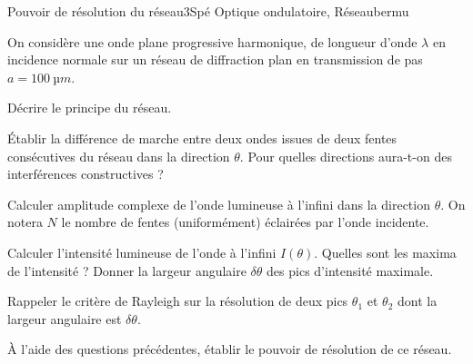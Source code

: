 \begin{exercise}{Pouvoir de résolution du réseau}{3}{Spé}
{Optique ondulatoire, Réseau}{bermu}

On considère une onde plane progressive harmonique, de longueur d'onde $\lambda$ en incidence normale sur un réseau de diffraction plan en transmission de pas $a = \SI{100}{µm}$.

\begin{questions}
\questioncours Décrire le principe du réseau.

\question Établir la différence de marche entre deux ondes issues de deux fentes consécutives du réseau dans la direction $\theta$. Pour quelles directions aura-t-on des interférences constructives ?

\question Calculer amplitude complexe de l'onde lumineuse à l'infini dans la direction $\theta$. On notera $N$ le nombre de fentes (uniformément) éclairées par l'onde incidente.

\question Calculer l'intensité lumineuse de l'onde à l'infini $I(\theta)$. Quelles sont les maxima de l'intensité ? Donner la largeur angulaire $\delta\theta$ des pics d'intensité maximale.


\question Rappeler le critère de Rayleigh sur la résolution de deux pics $\theta_1$ et $\theta_2$ dont la largeur angulaire est $\delta\theta$.

\question \`A l'aide des questions précédentes, établir le pouvoir de résolution de ce réseau.

\end{questions}
\end{exercise} 

